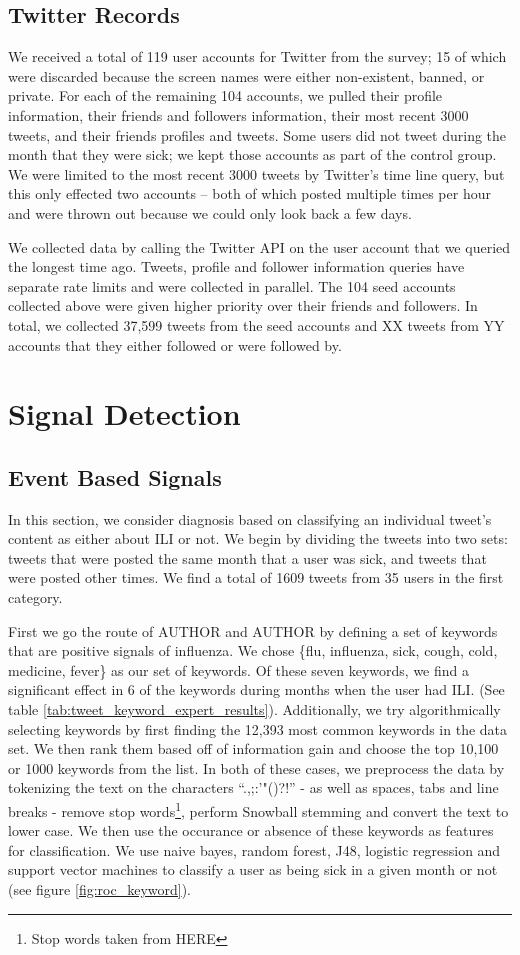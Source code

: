 \documentclass{acm_proc_article-sp}
\begin{document}
\subsection{Twitter Records}
We received a total of 119 user accounts for Twitter from the survey; 15 of which were discarded because the screen names were either non-existent, banned, or private. For each of the remaining 104 accounts, we pulled their profile information, their friends and followers information, their most recent 3000 tweets, and their friends profiles and tweets. Some users did not tweet during the month that they were sick; we kept those accounts as part of the control group. We were limited to the most recent 3000 tweets by Twitter's time line query, but this only effected two accounts -- both of which posted multiple times per hour and were thrown out because we could only look back a few days.

We collected data by calling the Twitter API on the user account that we queried the longest time ago. Tweets, profile and follower information queries have separate rate limits and were collected in parallel. The 104 seed accounts collected above were given higher priority over their friends and followers. In total, we collected 37,599 tweets from the seed accounts and XX tweets from YY accounts that they either followed or were followed by.


\section{Signal Detection}
\subsection{Event Based Signals}

In this section, we consider diagnosis based on classifying an individual tweet's content as either about ILI or not. We begin by dividing the tweets into two sets: tweets that were posted the same month that a user was sick, and tweets that were posted other times. We find a total of 1609 tweets from 35 users in the first category.

First we go the route of AUTHOR and AUTHOR by defining a set of keywords that are positive signals of influenza. We chose \{flu, influenza, sick, cough, cold, medicine, fever\} as our set of keywords. Of these seven keywords, we find a significant effect in 6 of the keywords during months when the user had ILI. (See table \ref{tab:tweet_keyword_expert_results}). Additionally, we try algorithmically selecting keywords by first finding the 12,393 most common keywords in the data set.  We then rank them based off of information gain and choose the top 10,100 or 1000 keywords from the list. In both of these cases, we preprocess the data by tokenizing the text on the characters ``.,;:'"()?!'' - as well as spaces, tabs and line breaks - remove stop words\footnote{Stop words taken from HERE}, perform Snowball stemming and convert the text to lower case. We then use the occurance or absence of these keywords as features for classification. We use naive bayes, random forest, J48, logistic regression and support vector machines to classify a user as being sick in a given month or not (see figure \ref{fig:roc_keyword}).
\end{document}
